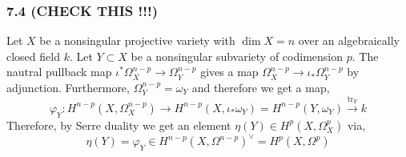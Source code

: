 \documentclass[12pt]{article}
\begin{document}
\subsubsection{7.4 (CHECK THIS !!!)}

\renewcommand{\tr}{\mathrm{tr}}

Let $X$ be a nonsingular projective variety with $\dim{X} = n$ over an algebraically closed field $k$. Let $Y \subset X$ be a nonsingular subvariety of codimension $p$. The nautral pullback map $\iota^* \Omega_{X}^{n-p} \to \Omega_{Y}^{n-p}$ gives a map $\Omega_{X}^{n - p} \to \iota_* \Omega_{Y}^{n-p}$ by adjunction. Furthermore, $\Omega_{Y}^{n-p} = \omega_Y$ and therefore we get a map,
\[ \varphi_Y : H^{n-p}(X, \Omega_X^{n-p}) \to H^{n-p}(X, \iota_* \omega_Y) = H^{n-p}(Y, \omega_Y) \xrightarrow{\mathrm{tr}_Y} k \]
Therefore, by Serre duality we get an element $\eta(Y) \in H^p(X, \Omega_X^p)$ via,
\[ \eta(Y) = \varphi_Y \in H^{n-p}(X, \Omega^{n-p})^\vee = H^p(X, \Omega^p) \]
\end{document}
